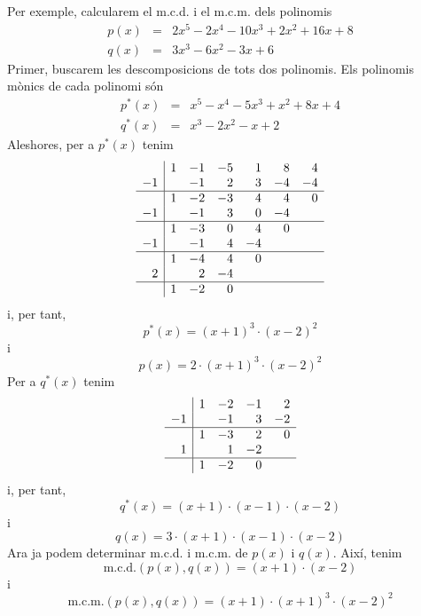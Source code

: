 Per exemple, calcularem el m.c.d. i el m.c.m. dels polinomis\begin{eqnarray*}
p(x) &=&2x^{5}-2x^{4}-10x^{3}+2x^{2}+16x+8 \\
q(x) &=&3x^{3}-6x^{2}-3x+6
\end{eqnarray*}Primer, buscarem les descomposicions de tots dos polinomis. Els polinomis
mònics de cada polinomi són\begin{eqnarray*}
p^{\ast }(x) &=&x^{5}-x^{4}-5x^{3}+x^{2}+8x+4 \\
q^{\ast }(x) &=&x^{3}-2x^{2}-x+2
\end{eqnarray*}
Aleshores, per a $p^{\ast }(x)$ tenim\begin{equation*}
\begin{array}{r|rrrrrr}
& 1 & -1 & -5 & 1 & 8 & 4 \\
-1 & & -1 & 2 & 3 & -4 & -4 \\ \hline
& 1 & -2 & -3 & 4 & 4 & 0 \\
-1 & & -1 & 3 & 0 & -4 & \\ \hline
& 1 & -3 & 0 & 4 & 0 & \\
-1 & & -1 & 4 & -4 & & \\ \hline
& 1 & -4 & 4 & 0 & & \\
2 & & 2 & -4 & & & \\ \hline
& 1 & -2 & 0 & & &
\end{array}\end{equation*}i, per tant,\begin{equation*}
p^{\ast }(x)=(x+1)^{3}\cdot (x-2)^{2}
\end{equation*}i\begin{equation*}
p(x)=2\cdot (x+1)^{3}\cdot (x-2)^{2}
\end{equation*}Per a $q^{\ast }(x)$ tenim\begin{equation*}
\begin{array}{r|rrrr}
& 1 & -2 & -1 & 2 \\
-1 & & -1 & 3 & -2 \\ \hline
& 1 & -3 & 2 & 0 \\
1 & & 1 & -2 & \\ \hline
& 1 & -2 & 0 &
\end{array}\end{equation*}i, per tant,\begin{equation*}
q^{\ast }(x)=(x+1)\cdot (x-1)\cdot (x-2)
\end{equation*}i\begin{equation*}
q(x)=3\cdot (x+1)\cdot (x-1)\cdot (x-2)
\end{equation*}Ara ja podem determinar m.c.d. i m.c.m. de $p(x)$ i $q(x)$. Així,
tenim\begin{equation*}
\text{m.c.d.}\left( p(x),q(x)\right) =(x+1)\cdot (x-2)
\end{equation*}i\begin{equation*}
\text{m.c.m.}\left( p(x),q(x)\right) =(x+1)\cdot (x+1)^{3}\cdot (x-2)^{2}
\end{equation*}

